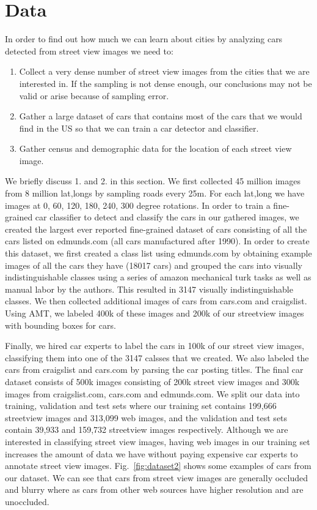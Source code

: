 \documentclass[10pt,twocolumn,letterpaper]{article}
\begin{document}
\section{Data}
\label{sec:dataset}
In order to find out how much we can learn about cities by analyzing cars detected from street view images we need to:
  \begin{enumerate}
    \item Collect a very dense number of street view images from the cities that we are interested in. If the sampling is not dense enough, our conclusions may not be valid or arise because of sampling error.
    \item Gather a large dataset of cars that contains most of the cars that we would find in the US so that we can train a car detector and classifier. 
    \item Gather census and demographic data for the location of each street view image.
  \end{enumerate}
  We briefly discuss 1. and 2. in this section.
We first collected 45 million images from 8 million lat,longs by sampling roads every 25m. For each lat,long we have images at 0, 60, 120, 180, 240, 300 degree rotations. In order to train a fine-grained car classifier to detect and classify the cars in our gathered images, we created the largest ever reported fine-grained dataset of cars consisting of all the cars listed on edmunds.com (all cars manufactured after 1990). In order to create this dataset, we first created a class list using edmunds.com by obtaining example images of all the cars they have (18017 cars) and grouped the cars into visually indistinguishable classes using a series of amazon mechanical turk tasks as well as manual labor by the authors. This resulted in 3147 visually indistinguishable classes. We then collected additional images of cars from cars.com and craigslist. Using AMT, we labeled 400k of these images and 200k of our streetview images with bounding boxes for cars. 

Finally, we hired car experts to label the cars in 100k of our  street view images, classifying them into one of the 3147 calsses that we created. We also labeled the cars from craigslist and cars.com by parsing the car posting titles. The final car dataset consists of 500k images consisting of 200k street view images and 300k images from craigslist.com, cars.com and edmunds.com. We split our data into training, validation and test sets where our training set contains 199,666 streetview images and 313,099 web images, and the validation and test sets contain 39,933 and 159,732 streetview images respectively. Although we are interested in classifying street view images, having web images in our training set increases the amount of data we have without paying expensive car experts to annotate street view images. Fig.~\ref{fig:dataset2} shows some examples of cars from our dataset. We can see that cars from street view images are generally occluded and blurry where as cars from other web sources have higher resolution and are unoccluded.
\end{document}
